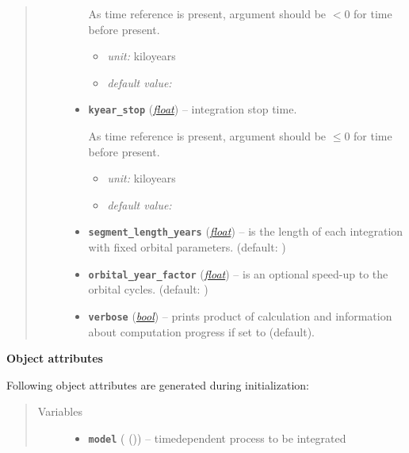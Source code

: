 \documentclass[a4paper,10pt,english]{sphinxmanual}
\begin{document}
\begin{fulllineitems}
\begin{quote}
\begin{description}
\begin{itemize}
As time reference
is present, argument should be \(<0\) 
for time before present.
\begin{itemize}
\item {} 
\emph{unit:} kiloyears

\item {} 
\emph{default value:} 

\end{itemize}


\item {} 
\textbf{\texttt{kyear\_stop}} (\href{http://docs.python.org/2.7/library/functions.html\#float}{\emph{float}}) -- 
integration stop time.

As time reference
is present, argument should be \(\le 0\) 
for time before present.
\begin{itemize}
\item {} 
\emph{unit:} kiloyears

\item {} 
\emph{default value:} 

\end{itemize}


\item {} 
\textbf{\texttt{segment\_length\_years}} (\href{http://docs.python.org/2.7/library/functions.html\#float}{\emph{float}}) -- is the length of each integration with
fixed orbital parameters. (default: )

\item {} 
\textbf{\texttt{orbital\_year\_factor}} (\href{http://docs.python.org/2.7/library/functions.html\#float}{\emph{float}}) -- is an optional speed-up to the orbital cycles.
(default: )

\item {} 
\textbf{\texttt{verbose}} (\href{http://docs.python.org/2.7/library/functions.html\#bool}{\emph{bool}}) -- prints product of calculation and
information about computation progress
if set to  (default).

\end{itemize}

\end{description}\end{quote}

\textbf{Object attributes}

Following object attributes are generated during initialization:
\begin{quote}\begin{description}
\item[{Variables}] \leavevmode\begin{itemize}
\item {} 
\textbf{\texttt{model}} ({\hyperref[api/climlab.process:climlab.process.time_dependent_process.TimeDependentProcess]{\emph{}}} ()) -- timedependent process to be integrated


\end{itemize}
\end{description}
\end{quote}
\end{fulllineitems}
\end{document}
